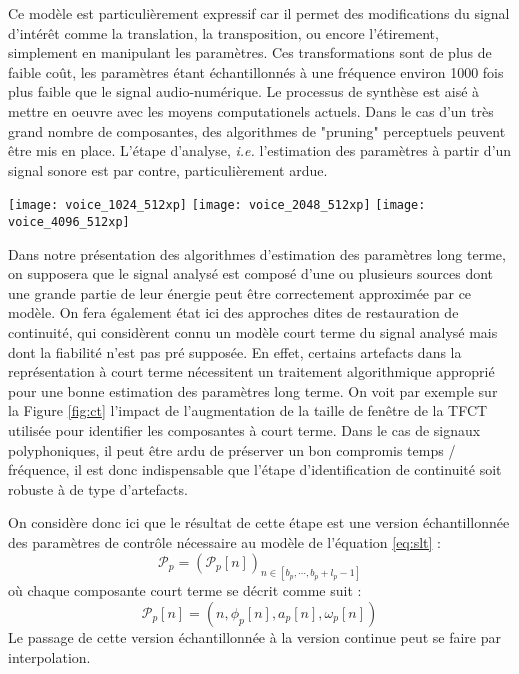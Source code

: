 Ce modèle est particulièrement expressif car il permet des modifications du signal d'intérêt comme la translation, la transposition, ou encore l'étirement, simplement en manipulant les paramètres. Ces transformations sont de plus de faible coût, les paramètres étant échantillonnés à une fréquence environ 1000 fois plus faible que le signal audio-numérique. Le processus de synthèse est aisé à mettre en oeuvre avec les moyens computationels actuels. Dans le cas d'un très grand nombre de composantes, des algorithmes de "pruning" perceptuels peuvent être mis en place\cite{lagrangeDafx01}.
L'étape d'analyse, \textit{i.e.} l'estimation des paramètres à partir d'un signal sonore est par contre, particulièrement ardue.

\begin{figure*}
  \texttt{[image: voice\_1024\_512xp]}
  \texttt{[image: voice\_2048\_512xp]}
  \texttt{[image: voice\_4096\_512xp]}
  \caption{Influence de la taille de fenêtre de la TFCT utilisée pour estimer un modèle sinusoïdal à court terme. De gauche à droite, la taille est de 25, 50, et 100ms, pour un pas d'avancement de 10ms.}
  \label{fig:ct}
\end{figure*}

Dans notre présentation des algorithmes d'estimation des paramètres long terme, on supposera que le signal analysé est composé d'une ou plusieurs sources dont une grande partie de leur énergie peut être correctement approximée par ce modèle. On fera également état ici des approches dites de \og restauration \fg de continuité, qui considèrent connu un modèle court terme du signal analysé mais dont la fiabilité n'est pas pré supposée. En effet, certains artefacts dans la représentation à court terme nécessitent un traitement algorithmique approprié pour une bonne estimation des paramètres long terme. On voit par exemple sur la Figure \ref{fig:ct} l'impact de l'augmentation de la taille de fenêtre de la TFCT utilisée pour identifier les composantes à court terme. Dans le cas de signaux polyphoniques, il peut être ardu de préserver un bon compromis temps / fréquence, il est donc indispensable que l'étape d'identification de continuité soit robuste à de type d'artefacts.

On considère donc ici que le résultat de cette étape est une version échantillonnée des paramètres de contrôle nécessaire au modèle de l'équation \ref{eq:slt} :
\begin{equation}
\mathcal{P}_{p}=\left(\mathcal{P}_{p}[n]\right)_{n \in\left[b_{p}, \cdots, b_{p}+l_{p}-1\right]}
\end{equation}
où chaque composante court terme se décrit comme suit :
\begin{equation}
\mathcal{P}_{p}[n]=\left(n, \phi_{p}[n], a_{p}[n], \omega_{p}[n]\right)
\end{equation}
Le passage de cette version échantillonnée à la version continue peut se faire par interpolation.

